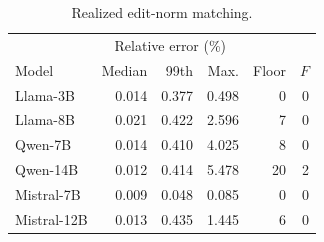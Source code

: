 \begin{table}[H]
\centering
\small
\setlength{\tabcolsep}{2pt}
\caption{Realized edit-norm matching.}
\label{tab:frozen-norms}
\begin{tabular*}{\linewidth}{@{\extracolsep{\fill}}lrrrrr@{}}
\toprule
& \multicolumn{3}{c}{Relative error (\%)} & & \\
Model & Median & 99th & Max. & Floor & $F$ \\
\midrule
Llama-3B & 0.014 & 0.377 & 0.498 & 0 & 0 \\
Llama-8B & 0.021 & 0.422 & 2.596 & 7 & 0 \\
Qwen-7B & 0.014 & 0.410 & 4.025 & 8 & 0 \\
Qwen-14B & 0.012 & 0.414 & 5.478 & 20 & 2 \\
Mistral-7B & 0.009 & 0.048 & 0.085 & 0 & 0 \\
Mistral-12B & 0.013 & 0.435 & 1.445 & 6 & 0 \\
\bottomrule
\end{tabular*}
\end{table}
